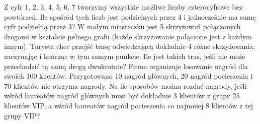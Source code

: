 Z cyfr 1, 2, 3, 4, 5, 6, 7 tworzymy wszystkie możliwe liczby czterocyfrowe bez powtórzeń. Ile spośród tych liczb jest podzielnych przez 4 i jednocześnie ma sumę cyfr podzielną przez 3?
W małym miasteczku jest 5 skrzyżowań połączonych drogami w kształcie pełnego grafu (każde skrzyżowanie połączone jest z każdym innym). Turysta chce przejść trasę odwiedzającą dokładnie 4 różne skrzyżowania, zaczynając i kończąc w tym samym punkcie. Ile jest takich tras, jeśli nie może przechodzić tą samą drogą dwukrotnie?
Firma organizuje losowanie nagród dla swoich 100 klientów. Przygotowano 10 nagród głównych, 20 nagród pocieszenia i 70 klientów nie otrzyma nagrody. Na ile sposobów można rozdać nagrody, jeśli wśród laureatów nagród głównych musi być dokładnie 3 klientów z grupy 25 klientów VIP, a wśród laureatów nagród pocieszenia co najmniej 8 klientów z tej grupy VIP?
